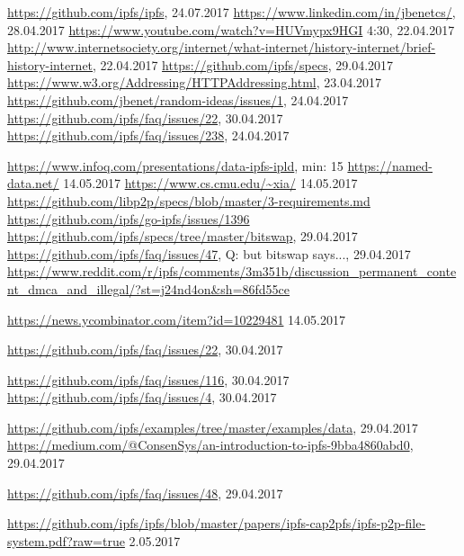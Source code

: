 \documentclass[a4paper,11pt, oneside]{report}
\theoremstyle{definition}
\begin{document}
\begin{thebibliography}{1}

 \url{https://github.com/ipfs/ipfs}, 24.07.2017
 \url{https://www.linkedin.com/in/jbenetcs/}, 28.04.2017
 \url{https://www.youtube.com/watch?v=HUVmypx9HGI} 4:30, 22.04.2017
 \url{http://www.internetsociety.org/internet/what-internet/history-internet/brief-history-internet}, 22.04.2017
 \url{https://github.com/ipfs/specs}, 29.04.2017
 \url{https://www.w3.org/Addressing/HTTPAddressing.html}, 23.04.2017 
 \url{https://github.com/jbenet/random-ideas/issues/1}, 24.04.2017
 \url{https://github.com/ipfs/faq/issues/22}, 30.04.2017
\url{https://github.com/ipfs/faq/issues/238}, 24.04.2017

 \url{https://www.infoq.com/presentations/data-ipfs-ipld}, min: 15
 \url{https://named-data.net/} 14.05.2017
 \url{https://www.cs.cmu.edu/~xia/} 14.05.2017
 \url{https://github.com/libp2p/specs/blob/master/3-requirements.md} 
 \url{https://github.com/ipfs/go-ipfs/issues/1396}
 \url{https://github.com/ipfs/specs/tree/master/bitswap}, 29.04.2017
 \url{https://github.com/ipfs/faq/issues/47}, Q: but bitswap says..., 29.04.2017
\url{https://www.reddit.com/r/ipfs/comments/3m351b/discussion_permanent_content_dmca_and_illegal/?st=j24nd4on&sh=86fd55ce}

 \url{https://news.ycombinator.com/item?id=10229481} 14.05.2017


 \url{https://github.com/ipfs/faq/issues/22}, 30.04.2017



 \url{https://github.com/ipfs/faq/issues/116}, 30.04.2017
 \url{https://github.com/ipfs/faq/issues/4}, 30.04.2017

 \url{https://github.com/ipfs/examples/tree/master/examples/data}, 29.04.2017
 \url{https://medium.com/@ConsenSys/an-introduction-to-ipfs-9bba4860abd0}, 29.04.2017

 \url{https://github.com/ipfs/faq/issues/48}, 29.04.2017

 \url{https://github.com/ipfs/ipfs/blob/master/papers/ipfs-cap2pfs/ipfs-p2p-file-system.pdf?raw=true} 2.05.2017



\end{thebibliography}
\end{document}
